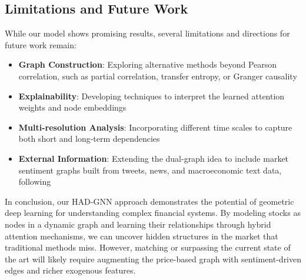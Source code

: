 \documentclass[12pt]{article}
\begin{document}
\subsection{Limitations and Future Work}

While our model shows promising results, several limitations and directions for future work remain:

\begin{itemize}
    \item \textbf{Graph Construction}: Exploring alternative methods beyond Pearson correlation, such as partial correlation, transfer entropy, or Granger causality
    \item \textbf{Explainability}: Developing techniques to interpret the learned attention weights and node embeddings
    \item \textbf{Multi-resolution Analysis}: Incorporating different time scales to capture both short and long-term dependencies
    \item \textbf{External Information}: Extending the dual-graph idea to include market sentiment graphs built from tweets, news, and macroeconomic text data, following \cite{du2023,zhang2024,liu2025}
\end{itemize}

In conclusion, our HAD-GNN approach demonstrates the potential of geometric deep learning for understanding complex financial systems. By modeling stocks as nodes in a dynamic graph and learning their relationships through hybrid attention mechanisms, we can uncover hidden structures in the market that traditional methods miss. However, matching or surpassing the current state of the art will likely require augmenting the price-based graph with sentiment-driven edges and richer exogenous features.

\newpage
\end{document}
